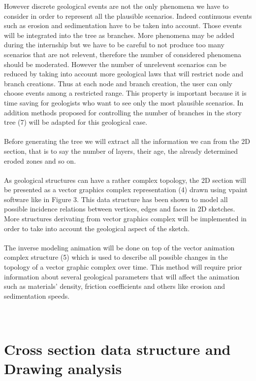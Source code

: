 \documentclass[12pt, a4paper]{memoir} %
\begin{document}
However discrete geological events are not the only phenomena we have to consider in order to represent all the plausible scenarios. Indeed continuous events such as erosion and sedimentation have to be taken into account. Those events will be integrated into the tree as branches.
More phenomena may be added during the internship but we have to be careful to not produce too many scenarios that are not relevent, therefore the number of considered phenomena should be moderated. However the number of unrelevent scenarios can be reduced by taking into account more geological laws that will restrict node and branch creations.
Thus at each node and branch creation, the user can only choose events among a restricted range. This property is important because it is time saving for geologists who want to see only the most plausible scenarios. In addition methods proposed for controlling the number of branches in the story tree (7) will be adapted for this geological case.\\\\

Before generating the tree we will extract all the information we can from the 2D section, that is to say the number of layers, their age, the already determined eroded zones and so on.\\\\

As geological structures can have a rather complex topology, the 2D section will be presented as a vector graphics complex representation (4) drawn using vpaint software like in Figure 3. This data structure has been shown to model all possible incidence relations between vertices, edges and faces in 2D sketches. More structures derivating from vector graphics complex will be implemented in order to take into account the geological aspect of the sketch.\\\\

The inverse modeling animation will be done on top of the vector animation complex structure (5) which is used to describe all possible changes in the topology of a vector graphic complex over time. This method will require prior information about several geological parameters that will affect the animation such as materials’ density, friction coefficients and others like erosion and sedimentation speeds.\\\\\

\section{Cross section data structure and Drawing analysis}
\end{document}
